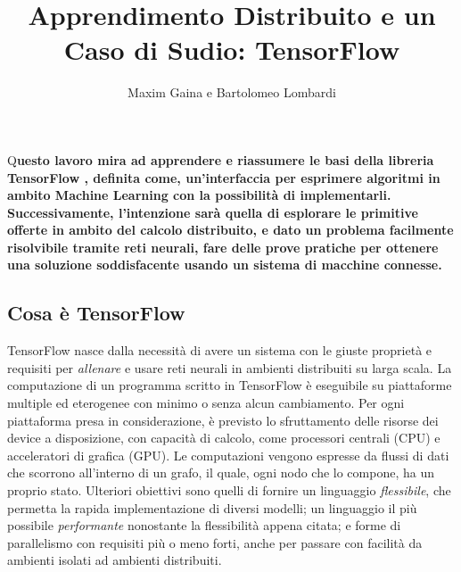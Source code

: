 \documentclass[DIV=calc, paper=a4, fontsize=11pt]{scrartcl}	 %
\title{Apprendimento Distribuito e un Caso di Sudio: TensorFlow} %
\author{Maxim Gaina e Bartolomeo Lombardi} %
\date{} %
\newcommand{\initial}[1]{ %
\lettrine[lines=3,lhang=0.3,nindent=0em]{
\color{DarkGoldenrod}
{\textsf{#1}}}{}}
\begin{document}
	\maketitle
	\thispagestyle{fancy}
	\initial{Q}\textbf{uesto lavoro mira ad apprendere e riassumere le basi della libreria TensorFlow \cite{tf}, definita come, un'interfaccia per esprimere algoritmi in ambito Machine Learning con la possibilità di implementarli. Successivamente, l'intenzione sarà quella di esplorare le primitive offerte in ambito del calcolo distribuito, e dato un problema facilmente risolvibile tramite reti neurali, fare delle prove pratiche per ottenere una soluzione soddisfacente usando un sistema di macchine connesse.}
	
	\begin{multicols}{2}
		\tableofcontents
		\section*{Cosa è TensorFlow}
			TensorFlow nasce dalla necessità di avere un sistema con le giuste proprietà e requisiti per \textit{allenare} e usare reti neurali in ambienti distribuiti su larga scala. La computazione di un programma scritto in TensorFlow è eseguibile su piattaforme multiple ed eterogenee con minimo o senza alcun cambiamento. Per ogni piattaforma presa in considerazione, è previsto lo sfruttamento delle risorse dei device a disposizione, con capacità di calcolo, come processori centrali (CPU) e acceleratori di grafica (GPU). Le computazioni vengono espresse da flussi di dati che scorrono all'interno di un grafo, il quale, ogni nodo che lo compone, ha un proprio stato. Ulteriori obiettivi sono quelli di fornire un linguaggio \textit{flessibile}, che permetta la rapida implementazione di diversi modelli; un linguaggio il più possibile \textit{performante} nonostante la flessibilità appena citata; e forme di parallelismo con requisiti più o meno forti, anche per passare con facilità da ambienti isolati ad ambienti distribuiti.
			

\end{multicols}
\end{document}

